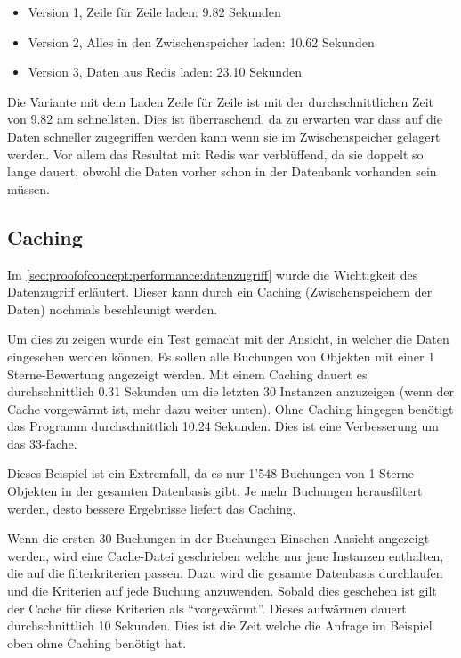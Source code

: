 \begin{itemize}
	\item Version 1, Zeile für Zeile laden: 9.82 Sekunden
	\item Version 2, Alles in den Zwischenspeicher laden: 10.62 Sekunden
	\item Version 3, Daten aus Redis laden: 23.10 Sekunden
\end{itemize}

Die Variante mit dem Laden Zeile für Zeile ist mit der durchschnittlichen Zeit von 9.82 am schnellsten. Dies ist überraschend, da zu erwarten war dass auf die Daten schneller zugegriffen werden kann wenn sie im Zwischenspeicher gelagert werden. Vor allem das Resultat mit Redis war verblüffend, da sie doppelt so lange dauert, obwohl die Daten vorher schon in der Datenbank vorhanden sein müssen.

\subsection{Caching}
\label{sec:proofofconcept:performance:caching}
Im \cref{sec:proofofconcept:performance:datenzugriff} wurde die Wichtigkeit des Datenzugriff erläutert. Dieser kann durch ein Caching (Zwischenspeichern der Daten) nochmals beschleunigt werden. 

Um dies zu zeigen wurde ein Test gemacht mit der Ansicht, in welcher die Daten eingesehen werden können. Es sollen alle Buchungen von Objekten mit einer 1 Sterne-Bewertung angezeigt werden. Mit einem Caching dauert es durchschnittlich 0.31 Sekunden um die letzten 30 Instanzen anzuzeigen (wenn der Cache vorgewärmt ist, mehr dazu weiter unten). Ohne Caching hingegen benötigt das Programm durchschnittlich 10.24 Sekunden. Dies ist eine Verbesserung um das 33-fache.

Dieses Beispiel ist ein Extremfall, da es nur 1'548 Buchungen von 1 Sterne Objekten in der gesamten Datenbasis gibt. Je mehr Buchungen herausfiltert werden, desto bessere Ergebnisse liefert das Caching.

Wenn die ersten 30 Buchungen in der Buchungen-Einsehen Ansicht angezeigt werden, wird eine Cache-Datei geschrieben welche nur jene Instanzen enthalten, die auf die filterkriterien passen. Dazu wird die gesamte Datenbasis durchlaufen und die Kriterien auf jede Buchung anzuwenden. Sobald dies geschehen ist gilt der Cache für diese Kriterien als "`vorgewärmt"'. 
Dieses aufwärmen dauert durchschnittlich 10 Sekunden. Dies ist die Zeit welche die Anfrage im Beispiel oben ohne Caching benötigt hat. 

